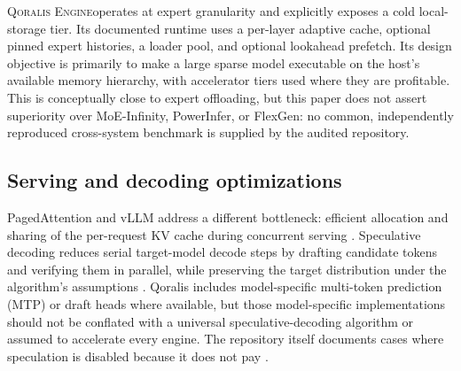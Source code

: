 \documentclass[10pt,twocolumn]{article}
\newcommand{\qoralis}{\textsc{Qoralis Engine}}
\begin{document}
\qoralis operates at expert granularity and explicitly exposes a cold local-storage tier. Its documented runtime uses a per-layer adaptive cache, optional pinned expert histories, a loader pool, and optional lookahead prefetch. Its design objective is primarily to make a large sparse model executable on the host's available memory hierarchy, with accelerator tiers used where they are profitable. This is conceptually close to expert offloading, but this paper does not assert superiority over MoE-Infinity, PowerInfer, or FlexGen: no common, independently reproduced cross-system benchmark is supplied by the audited repository.

\subsection{Serving and decoding optimizations}
PagedAttention and vLLM address a different bottleneck: efficient allocation and sharing of the per-request KV cache during concurrent serving \cite{kwon2023}. Speculative decoding reduces serial target-model decode steps by drafting candidate tokens and verifying them in parallel, while preserving the target distribution under the algorithm's assumptions \cite{leviathan2023}. Qoralis includes model-specific multi-token prediction (MTP) or draft heads where available, but those model-specific implementations should not be conflated with a universal speculative-decoding algorithm or assumed to accelerate every engine. The repository itself documents cases where speculation is disabled because it does not pay \cite{qoralistuning}.
\end{document}
